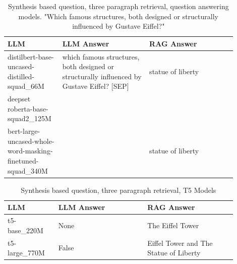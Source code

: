 \documentclass{wseas}
\begin{document}
\begin{table}[htbp]
  \centering
  \caption{Synthesis based question, three paragraph retrieval, question answering models. "Which famous structures, both designed or structurally influenced by Gustave Eiffel?"} %
  \label{tab:experiment_R_3_paragraph_Q_synthesis_M_QaModels_table}  %
  \begin{tabular}{|p{0.20\linewidth}|p{0.35\linewidth}|p{0.35\linewidth}|}
    \hline
    \textbf{LLM} & \textbf{LLM Answer} & \textbf{RAG Answer} \\
    \hline
    distilbert-base-uncased-distilled-squad\_66M & which famous structures, both designed or structurally influenced by Gustave Eiffel? {[}SEP{]} & statue of liberty \\
    \hline
    deepset roberta-base-squad2\_125M & & \\
    \hline
    bert-large-uncased-whole-word-masking-finetuned-squad\_340M & & statue of liberty \\
    \hline
  \end{tabular}
\end{table}
\begin{table}[htbp]
  \centering
  \caption{Synthesis based question, three paragraph retrieval, T5 Models} %
  \label{tab:experiment_R_3_paragraph_Q_synthesis_M_T5Models_table}  %
  \begin{tabular}{|p{0.20\linewidth}|p{0.35\linewidth}|p{0.35\linewidth}|}
    \hline
    \textbf{LLM} & \textbf{LLM Answer} & \textbf{RAG Answer} \\
    \hline
    t5-base\_220M & None & The Eiffel Tower \\
    \hline
    t5-large\_770M & False & Eiffel Tower and The Statue of Liberty \\
    \hline
  \end{tabular}
\end{table}
\end{document}
